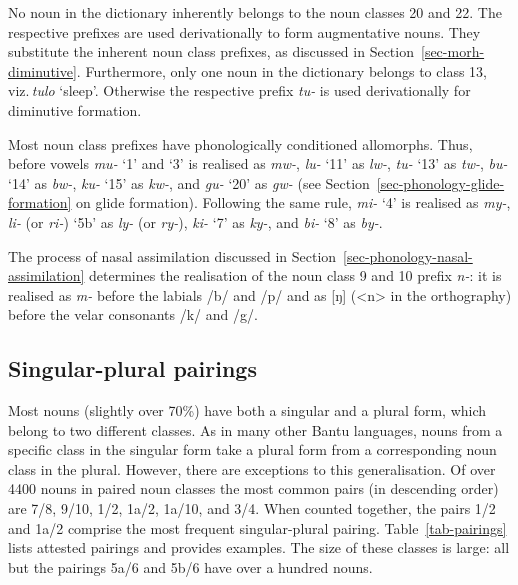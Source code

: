 No noun in the dictionary inherently belongs to the noun classes 20 and 22. 
The respective prefixes are used derivationally to form augmentative nouns. 
They substitute the inherent noun class prefixes, as discussed in Section~\ref{sec-morh-diminutive}.
Furthermore, only one noun in the dictionary belongs to class 13, viz.\,\textit{tulo} `sleep'. Otherwise the respective prefix \textit{tu-} is used derivationally for diminutive formation. 

Most noun class prefixes have phonologically conditioned allomorphs. 
Thus, before vowels \textit{mu-} `1' and `3' is realised as \textit{mw-}, \textit{lu-} `11' as \textit{lw-}, \textit{tu-} `13' as \textit{tw-}, \textit{bu-} `14' as \textit{bw-}, \textit{ku-} `15' as \textit{kw-}, and \textit{gu-} `20' as \textit{gw-} (see Section~\ref{sec-phonology-glide-formation} on glide formation). 
Following the same rule, \textit{mi-} `4' is realised as \textit{my-}, \textit{li-} (or \textit{ri-}) `5b' as \textit{ly-} (or \textit{ry-}), \textit{ki-} `7' as \textit{ky-}, and \textit{bi-} `8' as \textit{by-}.

The process of nasal assimilation discussed in Section~\ref{sec-phonology-nasal-assimilation} determines the realisation of the
noun class 9 and 10 prefix \textit{n-}: it is realised as \textit{m-} before the labials /b/ and /p/ and as [ŋ] (<n> in the orthography) before the velar consonants /k/ and /g/.


\subsection{Singular-plural pairings}\label{sec-morh-pairings}

Most nouns (slightly over 70\%) have both a singular and a plural form, which belong to two different classes. 
As in many other Bantu languages, nouns from a specific class in the singular form take a plural form from a corresponding noun class in the plural. 
However, there are exceptions to this generalisation. 
Of over 4400 nouns in paired noun classes the most common pairs (in descending order) are 7/8, 9/10, 1/2, 1a/2, 1a/10, and 3/4. 
When counted together, the pairs 1/2 and 1a/2 comprise the most frequent singular-plural pairing.  
Table~\ref{tab-pairings} lists attested pairings and provides examples. 
The size of these classes is large: all but the pairings 5a/6 and 5b/6 have over a hundred nouns.


